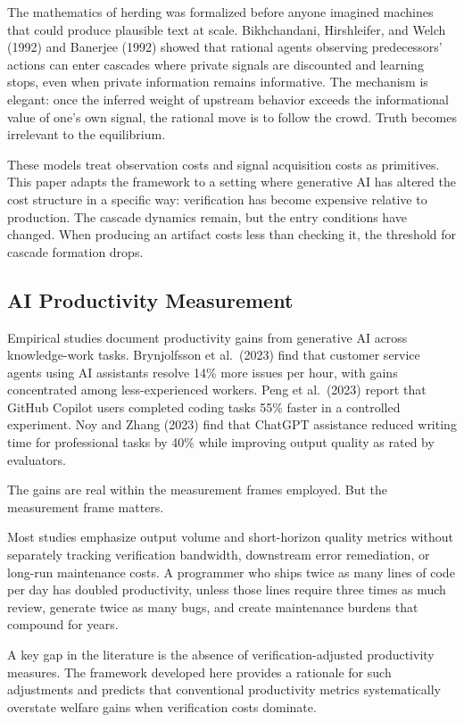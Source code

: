 \documentclass[11pt,a4paper]{article}
\begin{document}
The mathematics of herding was formalized before anyone imagined machines that could produce plausible text at scale. Bikhchandani, Hirshleifer, and Welch (1992) and Banerjee (1992) showed that rational agents observing predecessors' actions can enter cascades where private signals are discounted and learning stops, even when private information remains informative. The mechanism is elegant: once the inferred weight of upstream behavior exceeds the informational value of one's own signal, the rational move is to follow the crowd. Truth becomes irrelevant to the equilibrium.

These models treat observation costs and signal acquisition costs as primitives. This paper adapts the framework to a setting where generative AI has altered the cost structure in a specific way: verification has become expensive relative to production. The cascade dynamics remain, but the entry conditions have changed. When producing an artifact costs less than checking it, the threshold for cascade formation drops.

\hypertarget{ai-productivity-measurement}{%
\subsection{ AI Productivity Measurement}\label{ai-productivity-measurement}}

Empirical studies document productivity gains from generative AI across knowledge-work tasks. Brynjolfsson et al.~(2023) find that customer service agents using AI assistants resolve 14\% more issues per hour, with gains concentrated among less-experienced workers. Peng et al.~(2023) report that GitHub Copilot users completed coding tasks 55\% faster in a controlled experiment. Noy and Zhang (2023) find that ChatGPT assistance reduced writing time for professional tasks by 40\% while improving output quality as rated by evaluators.

The gains are real within the measurement frames employed. But the measurement frame matters.

Most studies emphasize output volume and short-horizon quality metrics without separately tracking verification bandwidth, downstream error remediation, or long-run maintenance costs. A programmer who ships twice as many lines of code per day has doubled productivity, unless those lines require three times as much review, generate twice as many bugs, and create maintenance burdens that compound for years.

A key gap in the literature is the absence of verification-adjusted productivity measures. The framework developed here provides a rationale for such adjustments and predicts that conventional productivity metrics systematically overstate welfare gains when verification costs dominate.
\end{document}
